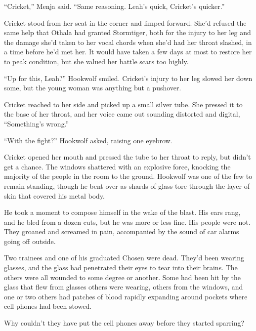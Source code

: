 ``Cricket,'' Menja said.  ``Same reasoning.  Leah's quick, Cricket's quicker.''



Cricket stood from her seat in the corner and limped forward.  She'd refused the same help that Othala had granted Stormtiger, both for the injury to her leg and the damage she'd taken to her vocal chords when she'd had her throat slashed, in a time before he'd met her.  It would have taken a few days at most to restore her to peak condition, but she valued her battle scars too highly.



``Up for this, Leah?'' Hookwolf smiled.  Cricket's injury to her leg slowed her down some, but the young woman was anything but a pushover.



Cricket reached to her side and picked up a small silver tube.  She pressed it to the base of her throat, and her voice came out sounding distorted and digital, ``Something's wrong.''



``With the fight?''  Hookwolf asked, raising one eyebrow.



Cricket opened her mouth and pressed the tube to her throat to reply, but didn't get a chance.  The windows shattered with an explosive force, knocking the majority of the people in the room to the ground.  Hookwolf was one of the few to remain standing, though he bent over as shards of glass tore through the layer of skin that covered his metal body.



He took a moment to compose himself in the wake of the blast.  His ears rang, and he bled from a dozen cuts, but he was more or less fine.  His people were not.  They groaned and screamed in pain, accompanied by the sound of car alarms going off outside.



Two trainees and one of his graduated Chosen were dead.  They'd been wearing glasses, and the glass had penetrated their eyes to tear into their brains.  The others were all wounded to some degree or another.  Some had been hit by the glass that flew from glasses others were wearing, others from the windows, and one or two others had patches of blood rapidly expanding around pockets where cell phones had been stowed.



Why couldn't they have put the cell phones away before they started sparring?



